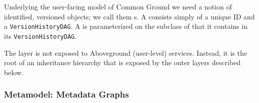 \documentclass{sig-alternate}
\begin{document}
Underlying the user-facing model of Common Ground we need a notion of identified, versioned objects; we call them {\thing}s.
A \thing consists simply of a
unique ID and a \texttt{VersionHistoryDAG}. A \thing is parameterized on the subclass of
\version that it contains in its \texttt{VersionHistoryDAG}.  


The \core layer is not exposed to Aboveground (user-level) services. 
Instead, it is the root of an inheritance hierarchy that is exposed by the outer layers described below.  

\subsubsection{\Mantle Metamodel: Metadata Graphs}


\end{document}
